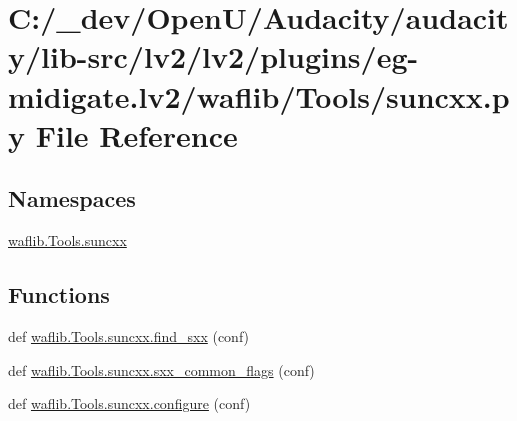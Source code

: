 \hypertarget{lv2_2plugins_2eg-midigate_8lv2_2waflib_2_tools_2suncxx_8py}{}\section{C\+:/\+\_\+dev/\+Open\+U/\+Audacity/audacity/lib-\/src/lv2/lv2/plugins/eg-\/midigate.lv2/waflib/\+Tools/suncxx.py File Reference}
\label{lv2_2plugins_2eg-midigate_8lv2_2waflib_2_tools_2suncxx_8py}
\subsection*{Namespaces}
\begin{DoxyCompactItemize}
\item 
 \hyperlink{namespacewaflib_1_1_tools_1_1suncxx}{waflib.\+Tools.\+suncxx}
\end{DoxyCompactItemize}
\subsection*{Functions}
\begin{DoxyCompactItemize}
\item 
def \hyperlink{namespacewaflib_1_1_tools_1_1suncxx_a88c1361f04aec9dca5a65944c5c06cb9}{waflib.\+Tools.\+suncxx.\+find\+\_\+sxx} (conf)
\item 
def \hyperlink{namespacewaflib_1_1_tools_1_1suncxx_abf9e33c219f7edbbb25eb5360ecf7089}{waflib.\+Tools.\+suncxx.\+sxx\+\_\+common\+\_\+flags} (conf)
\item 
def \hyperlink{namespacewaflib_1_1_tools_1_1suncxx_a07c4b17184f93e69ac10e64f97a20ace}{waflib.\+Tools.\+suncxx.\+configure} (conf)
\end{DoxyCompactItemize}
